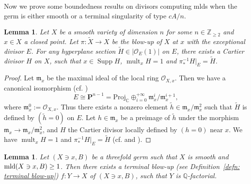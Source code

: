 \documentclass[11pt]{amsart}
\numberwithin{equation}{section}
\newcommand{\Cc}{\mathbb{C}}
\newcommand{\Qq}{\mathbb{Q}}
\newcommand{\Zz}{\mathbb{Z}}
\newcommand{\mld}{{\rm{mld}}}
\newcommand{\fm}{\mathfrak{m}}
\newcommand{\Supp}{\operatorname{Supp}}
\newcommand{\mult}{\operatorname{mult}}
\newtheorem{lem}[thm]{Lemma}
\theoremstyle{definition}
\theoremstyle{definition}
\begin{document}
Now we prove some boundedness results on divisors computing mlds when the germ is either smooth or a terminal singularity of type $cA/n$.


\begin{lem}\label{lem: general sections map surjectively to O(1)}
Let $X$ be a smooth variety of dimension $n$ for some $n\in \Zz_{\geq 2}$ and $x\in X$ a closed point. Let $\pi: \tilde{X}\to X$ be the blow-up of $X$ at $x$ with the exceptional divisor $E$. For any hyperplane section $\tilde{H}\in |\mathcal{O}_{E}(1)|$ on $E$, there exists a Cartier divisor $H$ on $X$, such that $x\in \Supp H$, $\mult_x H=1$ and $\pi_*^{-1}H|_E=\tilde{H}$.
\end{lem}

\begin{proof}
Let $\fm_x$ be the maximal ideal of the local ring $\mathcal{O}_{X,x}$. Then we have a canonical isomorphism (cf. \cite[\S2,~Theorem~8.24(b)]{Har77}) $$E\cong \mathbf{P}^{n-1}=\mathrm{Proj}_{\Cc} \oplus_{i=0}^{+\infty} \fm_x^i/\fm_x^{i+1},$$ where $\fm_x^0:=\mathcal{O}_{X,x}$. Thus there exists a nonzero element $\tilde{h}\in\fm_x/\fm_x^2$ such that $\tilde{H}$ is defined by $(\tilde{h}=0)$ on $E$. Let $h\in \fm_x$ be a preimage of $\tilde{h}$ under the morphism $\fm_x\to \fm_x/\fm_x^2$, and $H$ the Cartier divisor locally defined by $(h=0)$ near $x$. We have $\mult_x H=1$ and $\pi_*^{-1}H|_E=\tilde{H}$ (cf. \cite[Exercise~III-29]{EH00} and \cite[Exercise~IV-24]{EH00}).
\end{proof}



\begin{lem}\label{lem: can extract mld place smooth case}
Let $(X\ni x, B)$ be a threefold germ such that $X$ is smooth and $\mld(X\ni x, B)\geq 1$. Then there exists a terminal blow-up (see Definition~\ref{defn: terminal blow-up}) $f: Y\to X$ of $(X\ni x,B)$, such that $Y$ is $\Qq$-factorial. 
\end{lem}
\end{document}

